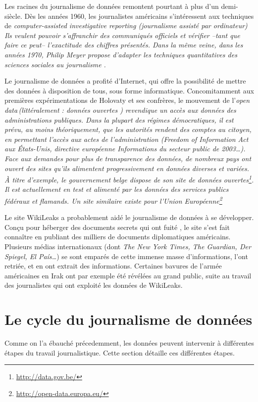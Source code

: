Les racines du journalisme de données remontent pourtant à plus d'un demi-siècle.
Dès les années 1960, les journalistes américains s'intéressent aux techniques de
\em computer-assisted investigative reporting \em (journalisme assisté par ordinateur)
Ils veulent pouvoir s'affranchir des communiqués officiels et vérifier --tant que
faire ce peut-- l'exactitude des chiffres présentés. Dans la même veine, dans les
années 1970, Philip Meyer propose d'adapter les techniques quantitatives des 
sciences sociales au journalisme \cite{meyer}.

Le journalisme de données a profité d'Internet, qui offre la possibilité de
mettre des données à disposition de tous, sous forme informatique. Concomitamment aux 
premières expérimentations de Holovaty et ses confrères, le mouvement de 
l'\em open data\em\,(littéralement : \og données ouvertes \fg) revendique un
accès aux données des administrations publiques. Dans la plupart des régimes 
démocratiques, il est prévu, au moins théoriquement, que les autorités rendent 
des comptes au citoyen, en permettant l'accès aux actes de l'administration
(\em Freedom of Information Act\em\,aux États-Unis, directive européenne \og Informations du secteur public \fg de 2003\dots).
Face aux demandes pour plus de transparence des données, de nombreux pays ont
ouvert des sites qu'ils alimentent progressivement en données diverses et variées.
À titre d'exemple, le gouvernement belge dispose de son site de données ouvertes\footnote{\url{http://data.gov.be/}}. Il est actuellement en test et alimenté par les données des services publics fédéraux et flamands. Un site similaire existe pour l'Union Européenne\footnote{\url{http://open-data.europa.eu/}}

Le site WikiLeaks a probablement aidé le journalisme de données à se développer.
Conçu pour héberger des documents secrets qui ont \og fuité \fg, le site
s'est fait connaître en publiant des milliers de documents diplomatiques américains.
Plusieurs médias internationaux (dont \textit{The New York Times, The Guardian, Der Spiegel, El País\dots}) se sont emparés de cette immense masse d'informations, l'ont
retriée, et en ont extrait des informations. Certaines bavures de l'armée américaines
en Irak ont par exemple été révélées au grand public, suite au travail des 
journalistes qui ont exploité les données de WikiLeaks.


\section{Le cycle du journalisme de données}
Comme on l'a ébauché précedemment, les données peuvent intervenir à différentes
étapes du travail journalistique. Cette section détaille ces différentes étapes.

